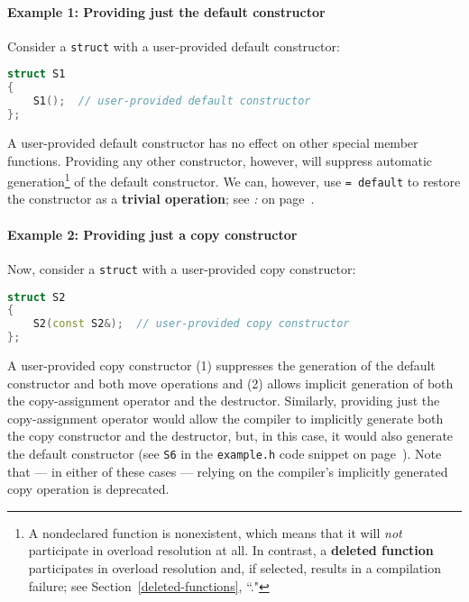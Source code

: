 \paragraph[Example 1: Providing just the default constructor]{Example 1: Providing just the default constructor}\label{example-1:-providing-just-the-default-constructor}

Consider a \texttt{struct} with a user-provided default constructor:

\begin{lstlisting}[language=C++]
struct S1
{
    S1();  // user-provided default constructor
};
\end{lstlisting}

\noindent A user-provided default constructor has no effect on other special
member functions. Providing any other constructor, however, will
suppress automatic generation{\cprotect\footnote{A nondeclared
function is nonexistent, which means that it will \emph{not}
participate in overload resolution at all. In contrast, a
\textbf{deleted function} participates in overload resolution and, if
selected, results in a compilation failure; see Section~\ref{deleted-functions}, ``."}} of the default constructor. We can, however, use
\texttt{=}~\texttt{default} to restore the constructor as a \textbf{trivial
operation}; see {\it{}: } on page~\pageref{restoring-the-generation-of-a-special-member-function-suppressed-by-another}.

\paragraph[Example 2: Providing just a copy constructor]{Example 2: Providing just a copy constructor}\label{example-2:-providing-just-a-copy-constructor}

Now, consider a \texttt{struct} with a user-provided copy constructor:

\begin{lstlisting}[language=C++]
struct S2
{
    S2(const S2&);  // user-provided copy constructor
};
\end{lstlisting}

\noindent A user-provided copy constructor (1) suppresses the generation of the
default constructor and both move operations and (2) allows implicit
generation of both the copy-assignment operator and the destructor.
Similarly, providing just the copy-assignment operator would allow the
compiler to implicitly generate both the copy constructor and the
destructor, but, in this case, it would also generate the default
constructor (see \texttt{S6} in the \texttt{example.h} code snippet on page~\pageref{default-exampleh-code}). Note that --- in either of these
cases --- relying on the compiler's implicitly generated copy operation
is deprecated.

